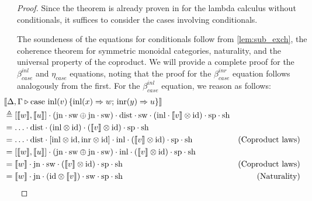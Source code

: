 \begin{proof}
  Since the theorem is already proven in \cite[Theorem 2.3]{dahlqvist2023syntactic} for the lambda calculus without conditionals, it suffices to consider the cases involving conditionals. 
  
  The soundeness of the equations for conditionals follow from \autoref{lem:sub_exch}, the coherence theorem for symmetric monoidal categories, naturality, and the universal property of the coproduct.   
  We will provide a complete proof for the $\beta_{case}^{inl}$ and $\eta_{case}$ equations, noting that the proof for the $\beta_{case}^{inr}$ equation follows analogously from the first. For the $\beta_{case}^{inl}$ equation, we reason as follows:
  \begin{align*}
    & \hspace{-30pt}  \llbracket \Delta,\Gamma \vljud  \text{case }  \text{inl}(v)\, \{\text{inl} (x) \Rightarrow w ;\, \text{inr} (y) \Rightarrow u\} \rrbracket \\
    & \hspace{-30pt}  \triangleq  [\llbracket w\rrbracket,\llbracket u \rrbracket] \comp (\text{jn} \comp \sw \oplus \text{jn} \comp \sw  ) \comp \dist \comp \sw \comp (\inl \comp \llbracket  v \rrbracket \otimes \id) \comp \text{sp} \comp \text{sh} \\
    & \hspace{-30pt} =  \ldots \comp \dist \comp (\inl \otimes \id  ) \comp ( \llbracket  v \rrbracket \otimes \id) \comp \text{sp} \comp \text{sh}  \\
    & \hspace{-30pt} =  \ldots \comp \dist \comp [\inl \otimes \id, \inr \otimes \id] \comp \inl  \comp ( \llbracket  v \rrbracket \otimes \id) \comp \text{sp} \comp \text{sh}  &(\text{Coproduct laws})\\
    & \hspace{-30pt} =  [\llbracket w\rrbracket,\llbracket u \rrbracket] \comp (\text{jn} \comp \sw \oplus \text{jn} \comp \sw )  \comp \inl  \comp ( \llbracket  v \rrbracket \otimes \id) \comp \text{sp} \comp \text{sh} \\
    & \hspace{-30pt}  = \llbracket  w \rrbracket\comp \text{jn} \comp   \sw \comp(\llbracket v \rrbracket \otimes  \id) \comp \text{sp} \comp \text{sh} & {\text{(Coproduct laws)}} \\
    &\hspace{-30pt}  =  \llbracket  w \rrbracket\comp \text{jn} \comp(  \id\otimes \llbracket v \rrbracket ) \comp   \sw \comp \text{sp} \comp \text{sh} & {\text{(Naturality)}} \\

\end{align*}
\end{proof}
